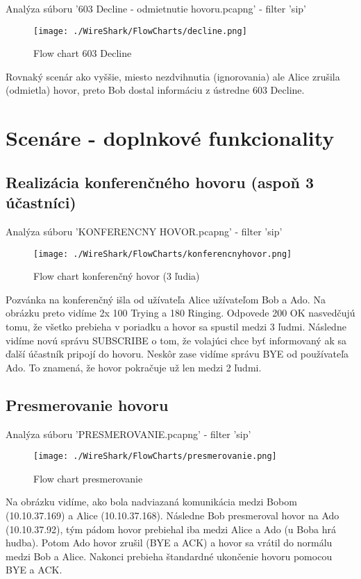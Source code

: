 \documentclass[10pt,oneside,slovak,a4paper]{article}
\begin{document}
\medskip

Analýza súboru '603 Decline - odmietnutie hovoru.pcapng' - filter 'sip'
\begin{figure}[h]
\centerline{\texttt{[image: ./WireShark/FlowCharts/decline.png]}} 
\caption{Flow chart 603 Decline}
\end{figure}

Rovnaký scenár ako vyššie, miesto nezdvihnutia (ignorovania) ale Alice zrušila (odmietla) hovor, preto Bob dostal informáciu z ústredne 603 Decline.

\newpage
\section{Scenáre - doplnkové funkcionality}
\subsection{Realizácia konferenčného hovoru (aspoň 3 účastníci)}
Analýza súboru 'KONFERENCNY HOVOR.pcapng' - filter 'sip'
\begin{figure}[h]
\centerline{\texttt{[image: ./WireShark/FlowCharts/konferencnyhovor.png]}} 
\caption{Flow chart konferenčný hovor (3 ľudia)}
\end{figure}

Pozvánka na konferenčný išla od užívateľa Alice užívateľom Bob a Ado. Na obrázku preto vidíme 2x 100 Trying a 180 Ringing. Odpovede 200 OK nasvedčujú tomu, že všetko prebieha v poriadku a hovor sa spustil medzi 3 ľudmi.  Následne vidíme novú správu SUBSCRIBE o tom, že volajúci chce byť informovaný ak sa ďalší účastník pripojí do hovoru.
Neskôr zase vidíme správu BYE od používateľa Ado. To znamená, že hovor pokračuje už len medzi 2 ľudmi. 

\newpage 

\subsection{Presmerovanie hovoru}
Analýza súboru 'PRESMEROVANIE.pcapng' - filter 'sip'
\begin{figure}[h]
\centerline{\texttt{[image: ./WireShark/FlowCharts/presmerovanie.png]}} 
\caption{Flow chart presmerovanie}
\end{figure}

Na obrázku vidíme, ako bola nadviazaná komunikácia medzi Bobom (10.10.37.169) a Alice (10.10.37.168). Následne Bob presmeroval hovor na Ado (10.10.37.92), tým pádom hovor prebiehal iba medzi Alice a Ado (u Boba hrá hudba). Potom Ado hovor zrušil (BYE a ACK) a hovor sa vrátil do normálu medzi Bob a Alice. Nakonci prebieha štandardné ukončenie hovoru pomocou BYE a ACK.
\end{document}
